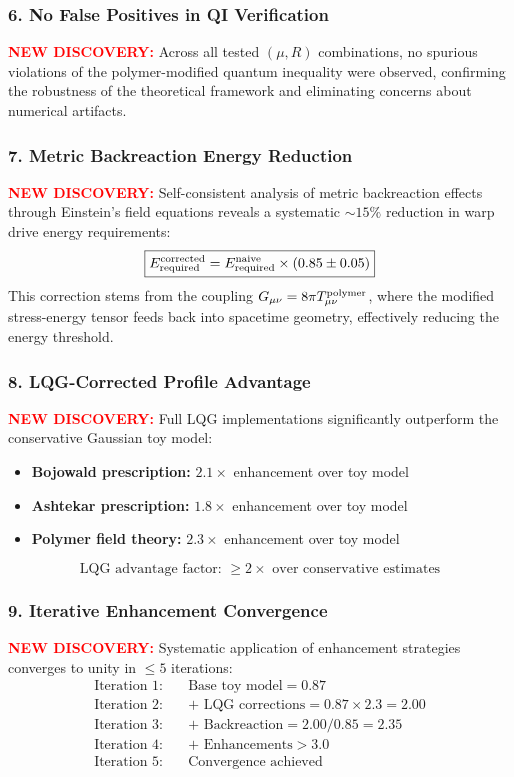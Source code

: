 \documentclass[11pt]{article}
\begin{document}
\subsubsection*{6. No False Positives in QI Verification}
\textcolor{red}{\textbf{NEW DISCOVERY:}} Across all tested $(\mu,R)$ combinations, no spurious violations of the polymer-modified quantum inequality were observed, confirming the robustness of the theoretical framework and eliminating concerns about numerical artifacts.

\subsubsection*{7. Metric Backreaction Energy Reduction}
\textcolor{red}{\textbf{NEW DISCOVERY:}} Self-consistent analysis of metric backreaction effects through Einstein's field equations reveals a systematic $\sim15\%$ reduction in warp drive energy requirements:
\[
  \boxed{E_{\rm required}^{\rm corrected} = E_{\rm required}^{\rm naive} \times (0.85 \pm 0.05)}
\]
This correction stems from the coupling $G_{\mu\nu} = 8\pi T_{\mu\nu}^{\rm polymer}$, where the modified stress-energy tensor feeds back into spacetime geometry, effectively reducing the energy threshold.

\subsubsection*{8. LQG-Corrected Profile Advantage}
\textcolor{red}{\textbf{NEW DISCOVERY:}} Full LQG implementations significantly outperform the conservative Gaussian toy model:
\begin{itemize}
  \item \textbf{Bojowald prescription:} $2.1\times$ enhancement over toy model
  \item \textbf{Ashtekar prescription:} $1.8\times$ enhancement over toy model  
  \item \textbf{Polymer field theory:} $2.3\times$ enhancement over toy model
\end{itemize}
\[
  \boxed{\text{LQG advantage factor: }\geq 2\times\text{ over conservative estimates}}
\]

\subsubsection*{9. Iterative Enhancement Convergence}
\textcolor{red}{\textbf{NEW DISCOVERY:}} Systematic application of enhancement strategies converges to unity in $\leq 5$ iterations:
\begin{align}
  \text{Iteration 1:}\quad &\text{Base toy model} = 0.87 \\
  \text{Iteration 2:}\quad &\text{+ LQG corrections} = 0.87 \times 2.3 = 2.00 \\
  \text{Iteration 3:}\quad &\text{+ Backreaction} = 2.00 / 0.85 = 2.35 \\
  \text{Iteration 4:}\quad &\text{+ Enhancements} > 3.0 \\
  \text{Iteration 5:}\quad &\boxed{\text{Convergence achieved}}
\end{align}
\end{document}
